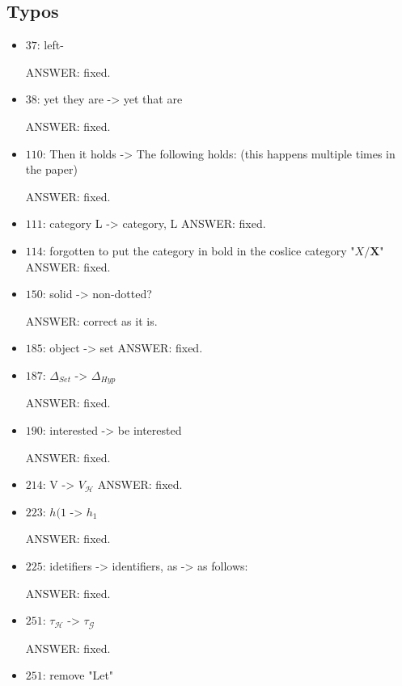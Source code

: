 \documentclass[english,11pt,a4paper]{article}
\begin{document}
\subsection*{Typos}

\begin{itemize}
\item $37$: left-

ANSWER: fixed.

\item $38$: yet they are -> yet that are

ANSWER: fixed.

\item $110$: Then it holds -> The following holds: (this happens multiple times in the paper)

ANSWER: fixed.

\item $111$: category L -> category, L
ANSWER: fixed.

\item $114$: forgotten to put the category in bold in the coslice category "$X/ \mathbf{X}$"
ANSWER: fixed.

\item $150$: solid -> non-dotted?

ANSWER: correct as it is.

\item $185$: object -> set
ANSWER: fixed.

\item $187$: $\Delta_{Set}$ -> $\Delta_{Hyp}$

ANSWER: fixed.

\item $190$: interested -> be interested

ANSWER: fixed.

\item $214$: V -> $V_\mathcal{H}$
ANSWER: fixed.

\item $223$: $h(1$ -> $h_1$

ANSWER: fixed.

\item $225$: idetifiers -> identifiers, as -> as follows:

ANSWER: fixed.

\item $251$: $\tau_\mathcal{H}$ -> $\tau_\mathcal{G}$

ANSWER: fixed.

\item $251$: remove "Let"


\end{itemize}
\end{document}
